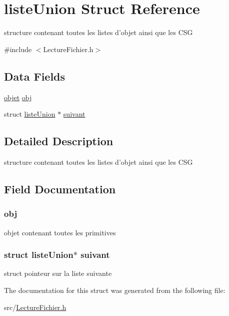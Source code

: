 \hypertarget{structliste_union}{
\section{listeUnion Struct Reference}
\label{structliste_union}
}


structure contenant toutes les listes d'objet ainsi que les CSG  




{\ttfamily \#include $<$LectureFichier.h$>$}

\subsection*{Data Fields}
\begin{DoxyCompactItemize}
\item 
\hyperlink{structobjet}{objet} \hyperlink{structliste_union_a09dc5c908d8f9c6875464379f83976c8}{obj}
\item 
struct \hyperlink{structliste_union}{listeUnion} $\ast$ \hyperlink{structliste_union_a85d44afca537a74207f00e63a0c26727}{suivant}
\end{DoxyCompactItemize}


\subsection{Detailed Description}
structure contenant toutes les listes d'objet ainsi que les CSG 

\subsection{Field Documentation}
\hypertarget{structliste_union_a09dc5c908d8f9c6875464379f83976c8}{
\subsubsection[{obj}]{ {\bf obj}}}
\label{structliste_union_a09dc5c908d8f9c6875464379f83976c8}
objet contenant toutes les primitives \hypertarget{structliste_union_a85d44afca537a74207f00e63a0c26727}{
\subsubsection[{suivant}]{\setlength{\rightskip}{0pt plus 5cm}struct {\bf listeUnion}$\ast$ {\bf suivant}}}
\label{structliste_union_a85d44afca537a74207f00e63a0c26727}
struct pointeur sur la liste suivante 

The documentation for this struct was generated from the following file:\begin{DoxyCompactItemize}
\item 
src/\hyperlink{_lecture_fichier_8h}{LectureFichier.h}\end{DoxyCompactItemize}
